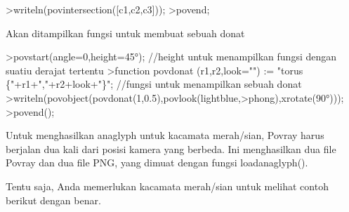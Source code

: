 \documentclass[a4paper,10pt]{article}
\begin{document}
\begin{eulernotebook}
\begin{eulercomment}
\begin{eulercomment}
\begin{eulercomment}
\begin{eulercomment}
\begin{eulercomment}
\begin{eulercomment}
\begin{eulercomment}
\begin{eulercomment}
\begin{eulercomment}
\begin{eulercomment}
\begin{eulercomment}
\begin{eulercomment}
\begin{euleroutput}
\end{euleroutput}
\begin{eulerprompt}
>writeln(povintersection([c1,c2,c3]));
>povend;
\end{eulerprompt}
\begin{eulercomment}
Akan ditampilkan fungsi untuk membuat sebuah donat
\end{eulercomment}
\begin{eulerprompt}
>povstart(angle=0,height=45°); //height untuk menampilkan fungsi dengan suatiu derajat tertentu 
>function povdonat (r1,r2,look="") := "torus \{"+r1+","+r2+look+"\}"; //fungsi untuk menampilkan sebuah donat
>writeln(povobject(povdonat(1,0.5),povlook(lightblue,>phong),xrotate(90°)));
>povend();
\end{eulerprompt}
\begin{eulercomment}
Untuk menghasilkan anaglyph untuk kacamata merah/sian, Povray harus
berjalan dua kali dari posisi kamera yang berbeda. Ini menghasilkan
dua file Povray dan dua file PNG, yang dimuat dengan fungsi
loadanaglyph().

Tentu saja, Anda memerlukan kacamata merah/sian untuk melihat contoh
berikut dengan benar.


\end{eulercomment}
\end{eulercomment}
\end{eulercomment}
\end{eulercomment}
\end{eulercomment}
\end{eulercomment}
\end{eulercomment}
\end{eulercomment}
\end{eulercomment}
\end{eulercomment}
\end{eulercomment}
\end{eulercomment}
\end{eulercomment}
\end{eulernotebook}
\end{document}
